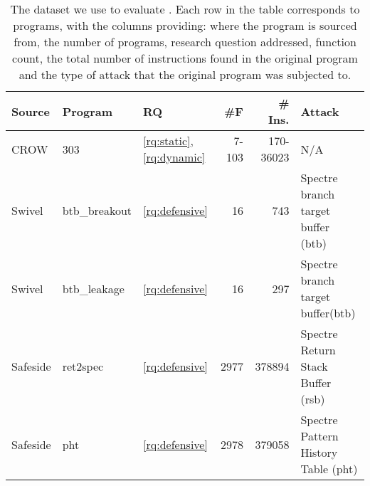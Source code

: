 
\begin{table}
\renewcommand\arraystretch{1.1}
\begin{adjustbox}{width=\linewidth,totalheight=\textheight, keepaspectratio}
    \begin{tabular}{p{1.5cm} | l | l | r | r | p{2cm}  }
        \hline
        Source & Program & RQ & \#F & \# Ins. & Attack  \\
        \hline \hline
        CROW \cite{arteaga2020crow} & 303 & \ref{rq:static}, \ref{rq:dynamic} & 7-103 & 170-36023 & N/A  \\
        \hline
        Swivel \cite{Swivel} & btb\_breakout & \ref{rq:defensive} & 16 & 743 & Spectre branch target buffer (btb)  \\
        \hline
        Swivel \cite{Swivel}  & btb\_leakage & \ref{rq:defensive} & 16 & 297 & Spectre branch target buffer(btb)  \\
        \hline
        Safeside \cite{Swivel, safeside}  & ret2spec & \ref{rq:defensive} & 2977 & 378894 & Spectre Return Stack Buffer (rsb)  \\
        \hline
        Safeside  \cite{Swivel, safeside} & pht & \ref{rq:defensive} & 2978 & 379058 & Spectre Pattern History Table (pht)  \\

    \end{tabular}
\end{adjustbox}
    
    \caption{The dataset we use to evaluate \tool. Each row in the table corresponds to programs, with the columns providing: where the program is sourced from, the number of programs, research question addressed, function count, the total number of instructions found in the original \wasm program and the type of attack that the original program was subjected to.}
    \label{tab:corpus}
\end{table}

